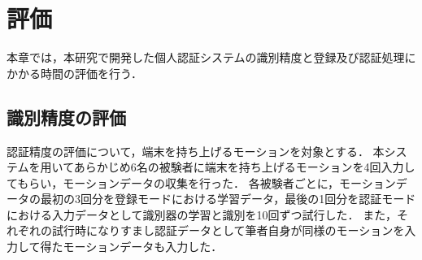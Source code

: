 \chapter{評価}
本章では，本研究で開発した個人認証システムの識別精度と登録及び認証処理にかかる時間の評価を行う．

\section{識別精度の評価}
認証精度の評価について，端末を持ち上げるモーションを対象とする．
本システムを用いてあらかじめ6名の被験者に端末を持ち上げるモーションを4回入力してもらい，モーションデータの収集を行った．
各被験者ごとに，モーションデータの最初の3回分を登録モードにおける学習データ，最後の1回分を認証モードにおける入力データとして識別器の学習と識別を10回ずつ試行した．
また，それぞれの試行時になりすまし認証データとして筆者自身が同様のモーションを入力して得たモーションデータも入力した．

